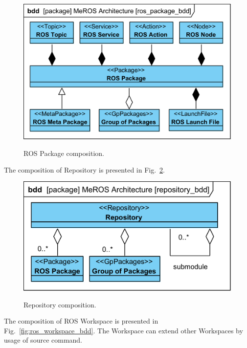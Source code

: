 \documentclass[11pt,oneside,a4paper]{report}
\begin{document}
	\begin{figure}[H]
		\centering
		\begin{center}
			{\includegraphics[scale=1.0]{diagrams/ros_package_bdd.png}}
		\end{center}
		\caption{ROS Package composition.} 
		\label{fig:ros_package_bdd}
	\end{figure}
		
		\pagebreak
		
		
The composition of Repository is presented in Fig.~\ref{fig:repository_bdd}.	
	
	\begin{figure}[H]
		\centering
		\begin{center}
			{\includegraphics[scale=1.0]{diagrams/repository_bdd.png}}
		\end{center}
		\caption{Repository composition.} 
		\label{fig:repository_bdd}
	\end{figure}

The composition of ROS Workspace is presented in Fig.~\ref{fig:ros_workspace_bdd}. The Workspace can extend other Workspaces by usage of source command.
\end{document}
